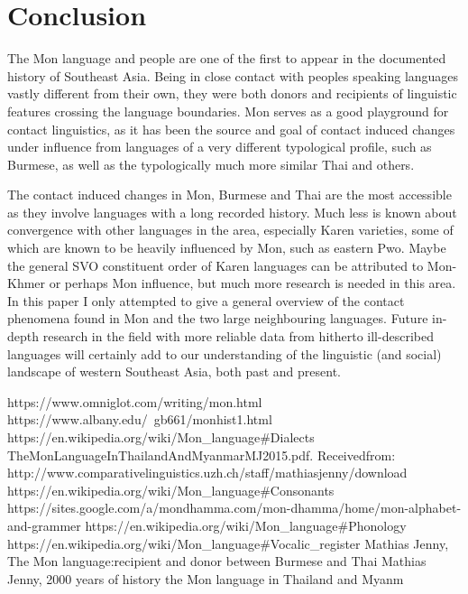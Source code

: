 \documentclass[conference]{IEEEtran}
\begin{document}
\section{Conclusion}
The Mon language and people are one of the first to appear in the documented history of Southeast Asia. Being in close contact with peoples speaking languages vastly different from their own, they were both donors and recipients of linguistic features crossing the language boundaries. Mon serves as a good playground for contact linguistics, as it has been the source and goal of contact induced changes under influence from languages of a very different typological profile, such as Burmese, as well as the typologically much more similar Thai and others. 
\par The contact induced changes in Mon, Burmese and Thai are the most accessible as they involve languages
with a long recorded history. Much less is known about convergence with other languages in the area, especially Karen varieties, some of which are known to be heavily influenced by Mon, such as eastern Pwo. Maybe the general SVO constituent order of Karen languages can be attributed to Mon-Khmer or perhaps Mon influence, but much more research is needed in this area. In this paper I only attempted to give a general overview of the contact phenomena found in Mon and the two large neighbouring languages. Future in-depth research in the field with more reliable data from hitherto ill-described languages will certainly add to our understanding of the
linguistic (and social) landscape of western Southeast Asia, both past and present.

\begin{thebibliography}{00}

 https://www.omniglot.com/writing/mon.html
 https://www.albany.edu/~gb661/monhist1.html
 https://en.wikipedia.org/wiki/Mon\_language\#Dialects
 TheMonLanguageInThailandAndMyanmarMJ2015.pdf. Receivedfrom: http://www.comparativelinguistics.uzh.ch/staff/mathiasjenny/download
 https://en.wikipedia.org/wiki/Mon\_language\#Consonants
 https://sites.google.com/a/mondhamma.com/mon-dhamma/home/mon-alphabet-and-grammer
 https://en.wikipedia.org/wiki/Mon\_language\#Phonology
 https://en.wikipedia.org/wiki/Mon\_language\#Vocalic\_register
 Mathias Jenny, The Mon language:recipient and donor between Burmese and Thai
 Mathias Jenny, 2000 years of history \- the Mon language in Thailand and Myanm

\end{thebibliography}
\end{document}
